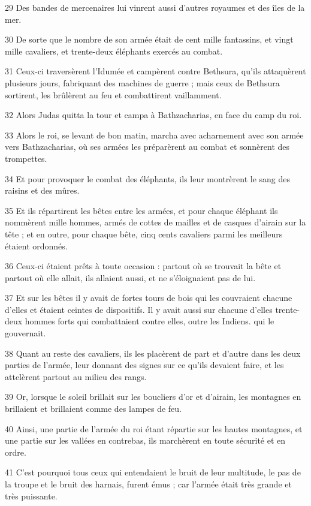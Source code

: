 \par 29 Des bandes de mercenaires lui vinrent aussi d'autres royaumes et des îles de la mer.
\par 30 De sorte que le nombre de son armée était de cent mille fantassins, et vingt mille cavaliers, et trente-deux éléphants exercés au combat.
\par 31 Ceux-ci traversèrent l'Idumée et campèrent contre Bethsura, qu'ils attaquèrent plusieurs jours, fabriquant des machines de guerre ; mais ceux de Bethsura sortirent, les brûlèrent au feu et combattirent vaillamment.
\par 32 Alors Judas quitta la tour et campa à Bathzacharias, en face du camp du roi.
\par 33 Alors le roi, se levant de bon matin, marcha avec acharnement avec son armée vers Bathzacharias, où ses armées les préparèrent au combat et sonnèrent des trompettes.
\par 34 Et pour provoquer le combat des éléphants, ils leur montrèrent le sang des raisins et des mûres.
\par 35 Et ils répartirent les bêtes entre les armées, et pour chaque éléphant ils nommèrent mille hommes, armés de cottes de mailles et de casques d'airain sur la tête ; et en outre, pour chaque bête, cinq cents cavaliers parmi les meilleurs étaient ordonnés.
\par 36 Ceux-ci étaient prêts à toute occasion : partout où se trouvait la bête et partout où elle allait, ils allaient aussi, et ne s'éloignaient pas de lui.
\par 37 Et sur les bêtes il y avait de fortes tours de bois qui les couvraient chacune d'elles et étaient ceintes de dispositifs. Il y avait aussi sur chacune d'elles trente-deux hommes forts qui combattaient contre elles, outre les Indiens. qui le gouvernait.
\par 38 Quant au reste des cavaliers, ils les placèrent de part et d'autre dans les deux parties de l'armée, leur donnant des signes sur ce qu'ils devaient faire, et les attelèrent partout au milieu des rangs.
\par 39 Or, lorsque le soleil brillait sur les boucliers d'or et d'airain, les montagnes en brillaient et brillaient comme des lampes de feu.
\par 40 Ainsi, une partie de l'armée du roi étant répartie sur les hautes montagnes, et une partie sur les vallées en contrebas, ils marchèrent en toute sécurité et en ordre.
\par 41 C'est pourquoi tous ceux qui entendaient le bruit de leur multitude, le pas de la troupe et le bruit des harnais, furent émus ; car l'armée était très grande et très puissante.
